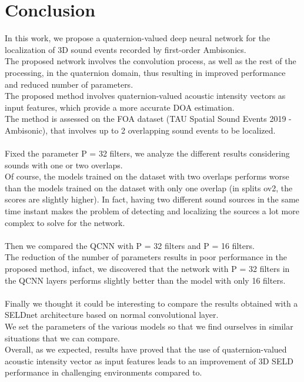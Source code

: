 \documentclass{article}
\begin{document}
\section{Conclusion}
    In this work, we propose a quaternion-valued deep neural network for the localization of 3D sound events recorded by first-order 
    Ambisonics.\\
    The proposed network involves the convolution process, as well as the rest of the processing, in the quaternion domain, thus 
    resulting in improved performance and reduced number of parameters. 
    \\ The proposed method involves quaternion-valued acoustic intensity vectors as input features, which provide a more accurate 
    DOA estimation.\\
    The method is assessed on the FOA dataset (TAU Spatial Sound Events 2019 - Ambisonic), that involves up to 2 overlapping sound 
    events to be localized.\\
    \\
    Fixed the parameter P = 32 filters, we analyze the different results considering sounds with one or two overlaps.\\
    Of course, the models trained on the dataset with two overlaps performs worse than the models trained on the dataset with only one 
    overlap (in splits ov2, the scores are slightly higher). In fact, having two different sound sources in the same time instant makes
    the problem of detecting and localizing the sources a lot more complex to solve for the network.\\
    \\
    Then we compared the QCNN with P = 32 filters and P = 16 filters.\\
    The reduction of the number of parameters results in poor performance in the proposed method, infact, we discovered that the 
    network with P = 32 filters in the QCNN layers performs slightly better than the model with only 16 filters.\\
    \\ 
    Finally we thought it could be interesting to compare the results obtained with a SELDnet architecture based on normal 
    convolutional layer.\\
    We set the parameters of the various models so that we find ourselves in similar situations that we can compare.\\
    Overall, as we expected, results have proved that the use of quaternion-valued acoustic intensity vector as input features 
    leads to an improvement of 3D SELD performance in challenging environments compared to.\\
\end{document}

